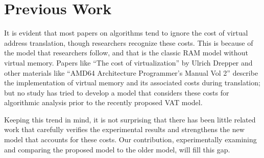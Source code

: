\section{Previous Work}

It is evident that most papers on algorithms tend to ignore the cost of virtual
address translation, though researchers recognize these costs. This is because
of the model that researchers follow, and that is the classic RAM model without
virtual memory. Papers like “The cost of virtualization” by Ulrich Drepper and
other materials like “AMD64 Architecture Programmer’s Manual Vol 2” describe
the implementation of virtual memory and its associated costs during
translation; but no study has tried to develop a model that considers these
costs for algorithmic analysis prior to the recently proposed VAT model.

Keeping this trend in mind, it is not surprising that there has been little
related work that carefully verifies the experimental results and strengthens
the new model that accounts for these costs. Our contribution, experimentally
examining and comparing the proposed model to the older model, will fill this
gap. 
